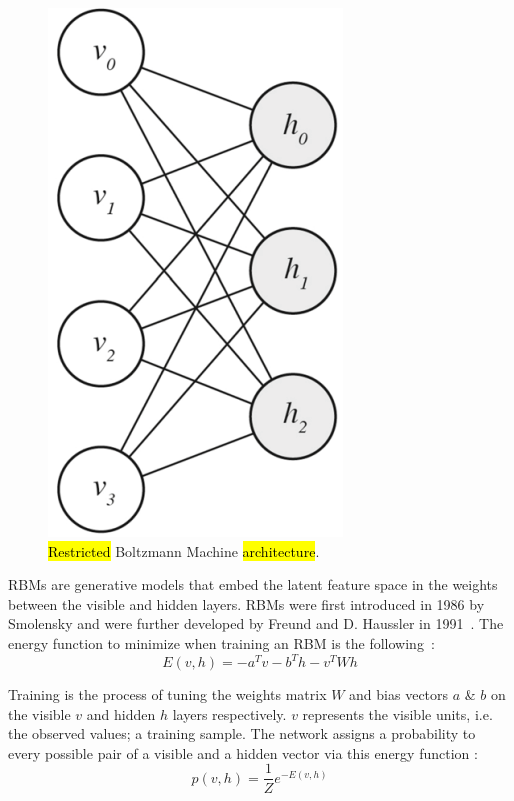 \documentclass[technologies,article,accept,pdftex,moreauthors]{Definitions/mdpi}
\begin{document}
\vspace{-6pt}
\begin{figure}[H]
    \includegraphics[width=0.53\columnwidth]{rbmgraph.png}
    \caption{\label{fig:rbmarch}\hl{Restricted} %
 Boltzmann Machine \hl{architecture}.}
\end{figure}



RBMs are generative models that embed the latent feature space in the weights between the visible and hidden layers. RBMs were first introduced in 1986 by Smolensky and were further developed by Freund and D. Haussler in 1991~\cite{Smolensky1986InformationPI,NIPS1991_33e8075e}. The energy function to minimize when training an RBM is the following~\cite{hopfield}: 
\begin{equation}
E(v, h) = -a^Tv -b^Th -v^TWh
\label{eq:rbmEnergy}
\end{equation}



Training is the process of tuning the weights matrix $W$ and bias vectors $a$ \& $b$ on the visible $v$ and hidden $h$ layers respectively. $v$ represents the visible units, i.e. the observed values; a training sample. The network assigns a probability to every possible pair of a visible and a hidden vector via this energy function \cite{Hinton2012}: 
\begin{equation}
p(v, h) = \frac{1}{Z}e^{-E(v,h)}
\end{equation}
\end{document}
